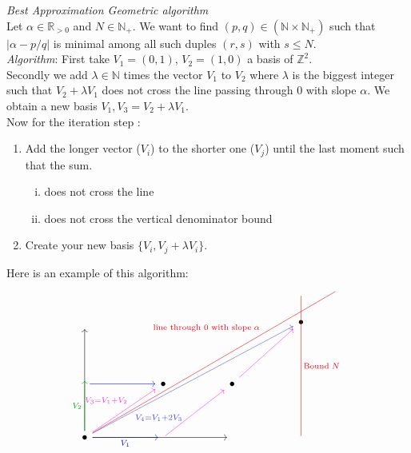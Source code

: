 \documentclass[a4paper,11pt,american]{article}
\newcommand{\N}{\mathbb{N}}
\newcommand{\R}{\mathbb{R}}
\newcommand{\Z}{\mathbb{Z}}
\theoremstyle{plain}
\theoremstyle{definition}
\begin{document}
\emph{Best Approximation Geometric algorithm}\\
Let $\alpha\in\R_{>0}$ and $N\in \N_+$. We want to find $(p,q)\in(\N\times\N_+)$ such that $\vert \alpha-p/q\vert$ is minimal among all such duples $(r,s)$ with $s\leq N$.\\
\emph{ Algorithm}: First take $V_1=(0,1)$, $V_2=(1,0)$ a basis of $\Z^2$.\\
Secondly we add $\lambda\in \N$ times the vector $V_1$ to $V_2$ where $\lambda$ is the biggest integer such that $V_2+\lambda V_1$ does not cross the line passing through $0$ with slope $\alpha$. We obtain a new basis $V_1,V_3=V_2+\lambda V_1$.\\
Now for the iteration step :
\begin{enumerate}
    \item Add the longer vector ($V_i$) to the shorter one ($V_j$) until the last moment such that the sum.
    \begin{enumerate}[i)]
    \item does not cross the line
    \item \label{ii} does not cross the vertical denominator bound
\end{enumerate}
\item Create your new basis $\{V_i,V_j+\lambda V_i\}$.
\end{enumerate}
Here is an example of this algorithm:
\[\begin{tikzcd}
	&&&&&& {} & {} \\
	{} &&&&&& \bullet \\
	&&&&&& {} \\
	{} && \bullet && \bullet \\
	\\
	\bullet & {} & {} && {} && {}
	\arrow[""{name=0, anchor=center, inner sep=0}, from=6-1, to=2-1]
	\arrow[color={rgb,255:red,0;green,8;blue,235}, from=4-1, to=4-3]
	\arrow["{V_1}"', color={rgb,255:red,0;green,8;blue,235}, from=6-1, to=6-3]
	\arrow["{V_3=V_1+V_2}"{pos=0.6}, color={rgb,255:red,255;green,51;blue,235}, from=6-1, to=4-3]
	\arrow[color={rgb,255:red,255;green,51;blue,235}, from=6-3, to=4-5]
	\arrow[color={rgb,255:red,255;green,51;blue,235}, from=4-5, to=2-7]
	\arrow["{\text{line through 0 with slope}\; \alpha}"{pos=0.7}, color={rgb,255:red,233;green,1;blue,17}, no head, from=6-1, to=1-8]
	\arrow["{V_4=V_1+2V_3}"'{pos=0.2}, color={rgb,255:red,79;green,79;blue,227}, from=6-1, to=2-7]
	\arrow[from=6-1, to=6-5]
	\arrow["{\text{Bound}\; N}", color={rgb,255:red,233;green,1;blue,17}, no head, from=1-7, to=6-7]
	\arrow["{V_2}", color={rgb,255:red,4;green,169;blue,4}, from=6-1, to=0]
\end{tikzcd}\]
\end{document}
